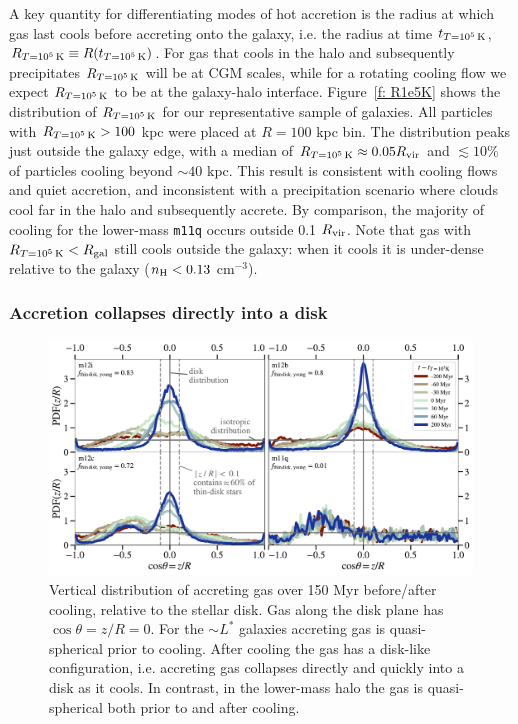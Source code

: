 \documentclass[fleqn,usenatbib]{mnras}
\newcommand{\Rcon}{R_{T=10^5\,{\rm K}}}
\newcommand{\tcon}{t_{T=10^5\,{\rm K}}}
\begin{document}
A key quantity for differentiating modes of hot accretion is the radius at which gas last cools before accreting onto the galaxy, i.e. the radius at time $\tcon$, $\Rcon \equiv R (\tcon)$.
For gas that cools in the halo and subsequently precipitates $\Rcon$ will be at CGM scales, while for a rotating cooling flow we expect $\Rcon$ to be at the galaxy-halo interface.
Figure~\ref{f: R1e5K} shows the distribution of $\Rcon$ for our representative sample of galaxies.
All particles with $\Rcon>100$ kpc were placed at $R=100$ kpc bin. 
The distribution peaks just outside the galaxy edge, with a median of $\Rcon \approx 0.05 R_{\rm vir}$ and $\lesssim 10\%$ of particles cooling beyond $\sim 40$ kpc.
This result is consistent with cooling flows and quiet accretion, and inconsistent with a precipitation scenario where clouds cool far in the halo and subsequently accrete.
By comparison, the majority of cooling for the lower-mass \texttt{m11q} occurs outside 0.1 $R_{\rm vir}$.
Note that gas with $\Rcon < R_{\rm gal}$ still cools outside the galaxy: when it cools it is under-dense relative to the galaxy ($n_{\rm H} < 0.13$ cm$^{-3}$).

\subsubsection{Accretion collapses directly into a disk}
\label{s: characteristics -- aligns}

\begin{figure}
    \centering
    \includegraphics[width=\textwidth]{figures/theta_vs_t.pdf}
    \caption{
    Vertical distribution of accreting gas over 150 Myr before/after cooling, relative to the stellar disk.
    Gas along the disk plane has $\cos\theta = z/R = 0$.
    For the $\sim L^*$ galaxies accreting gas is quasi-spherical prior to cooling.
    After cooling the gas has a disk-like configuration, i.e. accreting gas collapses directly and quickly into a disk as it cools. 
    In contrast, in the lower-mass halo the gas is quasi-spherical both prior to and after cooling.
    }
    \label{f: theta vs t}
\end{figure}
\end{document}
